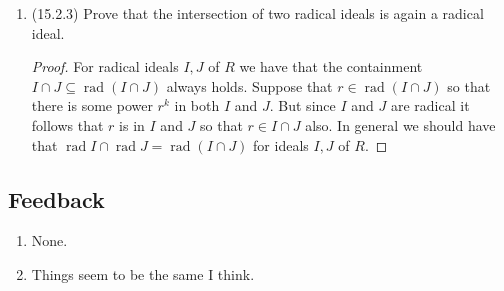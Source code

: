 \documentclass[11pt]{article}
\DeclareMathOperator{\rad}{rad}
\begin{document}
\begin{enumerate}
\begin{proof}
        The mapping $\Psi$ is injective: if $\sum a_{ij}f_i\otimes g_j \mapsto \sum a_{ij}f_ig_j = 0$ then for all $v\in V$ we have $\sum a_{ij}f_i(v)g_j = 0$ on $W$. By linear independence we must have that $\sum a_{ij}f_i = 0$ on $V$ so that again by linear independence we must have $a_{ij} = 0$ for each $i,j$ as needed. The mapping $\Psi$ is surjective since any monomial in $k[V\times W]$ is the product of monomials in $k[V]$ and $k[W]$, of which we can form preimages of under $\Psi$: for any monomial $a\prod_ix_i\prod_jy_j$ a preimage is $a\prod_ix_i\otimes \prod_jy_j$ and by linearity we obtain surjectivity. Hence $\Psi\colon k[V]\otimes_kk[W]\to k[V\times W]$ is an isomorphism of algebras.
    \end{proof}
    \item (15.2.3) Prove that the intersection of two radical ideals is again a radical ideal. \begin{proof}
        For radical ideals $I,J$ of $R$ we have that the containment $I\cap J\subseteq \rad (I\cap J)$ always holds. Suppose that $r\in \rad(I\cap J)$ so that there is some power $r^k$ in both $I$ and $J$. But since $I$ and $J$ are radical it follows that $r$ is in $I$ and $J$ so that $r\in I\cap J$ also. In general we should have that $\rad I\cap \rad J = \rad (I\cap J)$ for ideals $I,J$ of $R$.
    \end{proof}
\end{enumerate}
\subsection*{Feedback}
\begin{enumerate}
    \item None.
    \item Things seem to be the same I think.
\end{enumerate}
\end{document}
